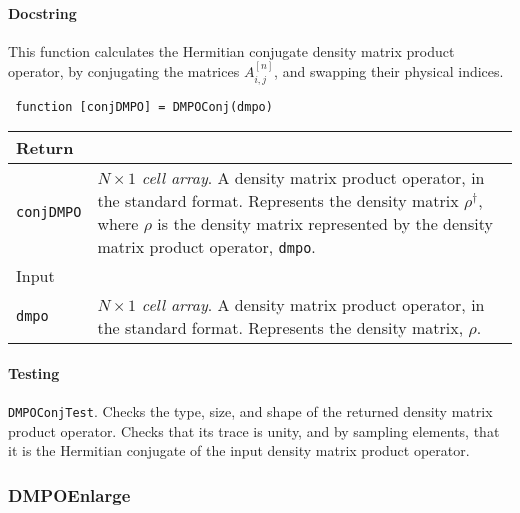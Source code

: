  \paragraph{Docstring} This function calculates the Hermitian conjugate density matrix product operator, by conjugating the matrices \(A^{[n]}_{i,j}\), and swapping their physical indices.
 \begin{lstlisting}
 function [conjDMPO] = DMPOConj(dmpo) \end{lstlisting}
 \begin{longtabu}{X[1,l]X[4,l]}
 \hline
 Return & \\ \hline
 \lstinline$conjDMPO$ & \emph{\(N \times 1\) cell array}. A density matrix product operator, in the standard format. Represents the density matrix \(\rho^{\dagger}\), where \(\rho\) is the density matrix represented by the density matrix product operator, \lstinline$dmpo$. \\ \hline
 Input & \\ \hline
 \lstinline$dmpo$ & \emph{\(N \times 1\) cell array}. A density matrix product operator, in the standard format. Represents the density matrix, \(\rho\). \\
 \hline
 \end{longtabu}
 \paragraph{Testing} \lstinline$DMPOConjTest$. Checks the type, size, and shape of the returned density matrix product operator. Checks that its trace is unity, and by sampling elements, that it is the Hermitian conjugate of the input density matrix product operator.

 \subsubsection{DMPOEnlarge}
